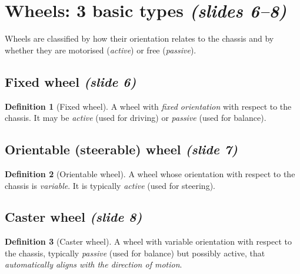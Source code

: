 \documentclass[11pt,a4paper]{article}
\theoremstyle{definition}
\newtheorem{definition}{Definition}[section]
\theoremstyle{plain}
\theoremstyle{remark}
\begin{document}
\section{Wheels: 3 basic types \emph{(slides 6--8)}}

Wheels are classified by how their orientation relates to the chassis and by whether they are motorised (\emph{active}) or free (\emph{passive}).

\subsection{Fixed wheel \emph{(slide 6)}}
\begin{definition}[Fixed wheel]
A wheel with \emph{fixed orientation} with respect to the chassis. It may be \emph{active} (used for driving) or \emph{passive} (used for balance).
\end{definition}

\subsection{Orientable (steerable) wheel \emph{(slide 7)}}
\begin{definition}[Orientable wheel]
A wheel whose orientation with respect to the chassis is \emph{variable}. It is typically \emph{active} (used for steering).
\end{definition}

\subsection{Caster wheel \emph{(slide 8)}}
\begin{definition}[Caster wheel]
A wheel with variable orientation with respect to the chassis, typically \emph{passive} (used for balance) but possibly active, that \emph{automatically aligns with the direction of motion}.
\end{definition}
\end{document}
